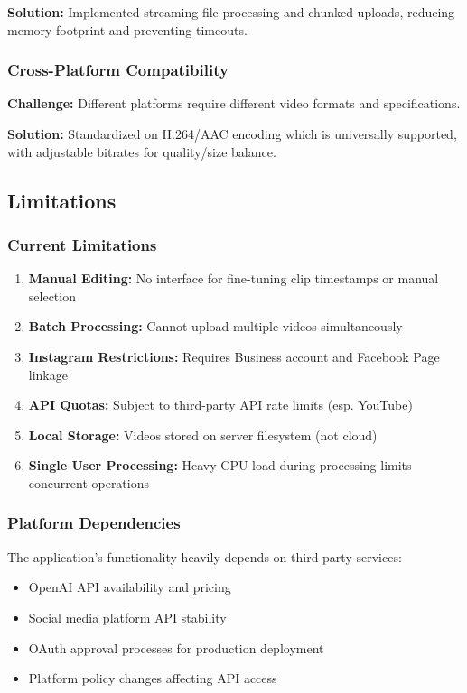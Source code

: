 \textbf{Solution:} Implemented streaming file processing and chunked uploads, reducing memory footprint and preventing timeouts.

\subsubsection{Cross-Platform Compatibility}

\textbf{Challenge:} Different platforms require different video formats and specifications.

\textbf{Solution:} Standardized on H.264/AAC encoding which is universally supported, with adjustable bitrates for quality/size balance.

\subsection{Limitations}

\subsubsection{Current Limitations}

\begin{enumerate}
    \item \textbf{Manual Editing:} No interface for fine-tuning clip timestamps or manual selection
    \item \textbf{Batch Processing:} Cannot upload multiple videos simultaneously
    \item \textbf{Instagram Restrictions:} Requires Business account and Facebook Page linkage
    \item \textbf{API Quotas:} Subject to third-party API rate limits (esp. YouTube)
    \item \textbf{Local Storage:} Videos stored on server filesystem (not cloud)
    \item \textbf{Single User Processing:} Heavy CPU load during processing limits concurrent operations
\end{enumerate}

\subsubsection{Platform Dependencies}

The application's functionality heavily depends on third-party services:
\begin{itemize}
    \item OpenAI API availability and pricing
    \item Social media platform API stability
    \item OAuth approval processes for production deployment
    \item Platform policy changes affecting API access
\end{itemize}

